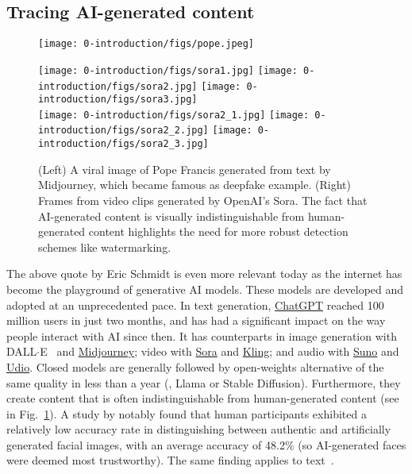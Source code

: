 \subsection*{Tracing AI-generated content}

\begin{figure}[b!]
    \centering
    \begin{minipage}[b]{0.25\textwidth}
        \texttt{[image: 0-introduction/figs/pope.jpeg]}
    \end{minipage}
    \hfill
    \begin{minipage}[b]{0.72\textwidth}
        \centering
        \texttt{[image: 0-introduction/figs/sora1.jpg]}\hfill
        \texttt{[image: 0-introduction/figs/sora2.jpg]}\hfill
        \texttt{[image: 0-introduction/figs/sora3.jpg]} \\[10pt]
        \texttt{[image: 0-introduction/figs/sora2\_1.jpg]}\hfill
        \texttt{[image: 0-introduction/figs/sora2\_2.jpg]}\hfill
        \texttt{[image: 0-introduction/figs/sora2\_3.jpg]}
    \end{minipage}
    \caption{
        (Left) A viral image of Pope Francis generated from text by Midjourney, which became famous as deepfake example.
        (Right) Frames from video clips generated by OpenAI's Sora.
        The fact that AI-generated content is visually indistinguishable from human-generated content highlights the need for more robust detection schemes like watermarking.
    }\label{intro/fig:pope}
\end{figure}



The above quote by Eric Schmidt is even more relevant today as the internet has become the playground of generative AI models.
These models are developed and adopted at an unprecedented pace.
In text generation, \href{https://chatgpt.com/}{ChatGPT} reached 100 million users in just two months, and has had a significant impact on the way people interact with AI since then.
It has counterparts in image generation with DALL$\cdot$E~\citep{ramesh2021zero} and \href{https://www.midjourney.com/}{Midjourney}; video with \href{https://openai.com/index/sora/}{Sora} and \href{https://kling.kuaishou.com/en}{Kling}; and audio with \href{https://suno.com/}{Suno} and \href{https://www.udio.com/}{Udio}.
Closed models are generally followed by open-weights alternative of the same quality in less than a year (\eg, Llama or Stable Diffusion).
Furthermore, they create content that is often indistinguishable from human-generated content (see in Fig.~\ref{intro/fig:pope}).
A study by \cite{nightingale2022ai} notably found that human participants exhibited a relatively low accuracy rate in distinguishing between authentic and artificially generated facial images, with an average accuracy of 48.2\% (so AI-generated faces were deemed most trustworthy).
The same finding applies to text~\citep{spitale2023ai}.

